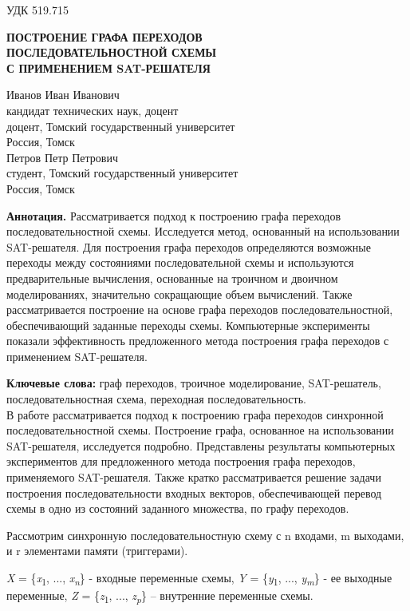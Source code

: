 \documentclass[a4paper,11pt]{article}
\begin{document}
\noindent
УДК 519.715

\begin{center}
\textbf{ПОСТРОЕНИЕ ГРАФА ПЕРЕХОДОВ \\ПОСЛЕДОВАТЕЛЬНОСТНОЙ СХЕМЫ \\ С ПРИМЕНЕНИЕМ SAT-РЕШАТЕЛЯ}

Иванов Иван Иванович\\
кандидат технических наук, доцент\\
доцент, Томский государственный университет\\
Россия, Томск\\
Петров Петр Петрович\\
студент, Томский государственный университет\\
Россия, Томск
\end{center}

\vspace{0.5cm}

\textbf{Аннотация.} Рассматривается подход к построению графа переходов последовательностной схемы. Исследуется метод, основанный на использовании SAT-решателя. Для построения графа переходов определяются возможные переходы между состояниями последовательной схемы и используются предварительные вычисления, основанные на троичном и двоичном моделированиях, значительно сокращающие объем вычислений. Также рассматривается построение на основе графа переходов последовательностной, обеспечивающий заданные переходы схемы. Компьютерные эксперименты показали эффективность предложенного метода построения графа переходов с применением SAT-решателя.

\textbf{Ключевые слова:} граф переходов, троичное моделирование, SAT-решатель, последовательностная схема, переходная последовательность. \\

В работе рассматривается подход к построению графа переходов синхронной последовательностной схемы. Построение графа, основанное на использовании SAT-решателя, исследуется подробно. Представлены результаты компьютерных экспериментов для предложенного метода построения графа переходов, применяемого SAT-решателя. Также кратко рассматривается решение задачи построения последовательности входных векторов, обеспечивающей перевод схемы в одно из состояний заданного множества, по графу переходов.

Рассмотрим синхронную последовательностную схему с {n} входами, m выходами, и r элементами памяти (триггерами).

\newpage
\noindent
\textit{X} = \{\textit{x}\textsubscript{1}, ..., \textit{x\textsubscript{n}}\} - входные переменные схемы, \textit{Y} = \{\textit{y}\textsubscript{1}, ..., \textit{y\textsubscript{m}}\} - ее выходные переменные, \textit{Z} = \{\textit{z}\textsubscript{1}, ..., \textit{z\textsubscript{p}}\} – внутренние переменные схемы.
\end{document}
